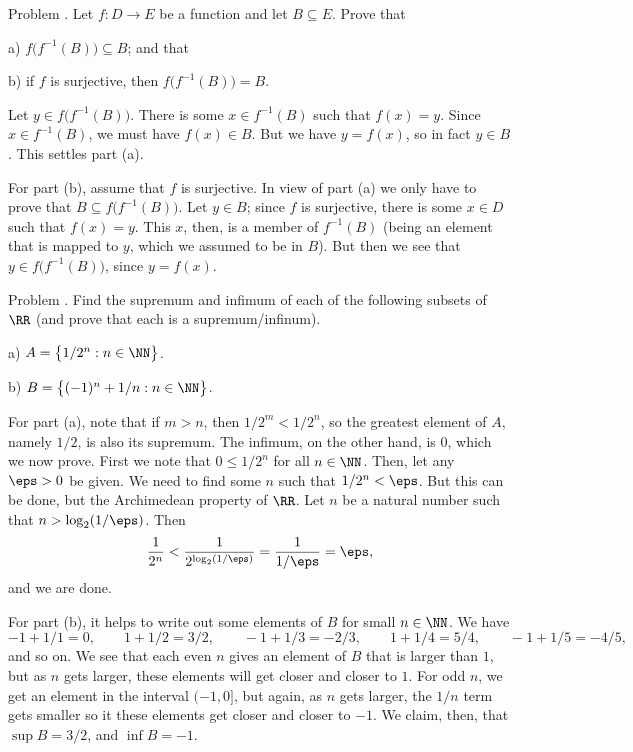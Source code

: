 


\def\To{\Rightarrow}


\bigskip

\proclaim Problem \advthm. Let $f:D\to E$ be a function and let $B\subseteq E$. Prove that
\medskip
\item{a)} $f\bigl( f^{-1}(B)\bigr) \subseteq B$; and that
\smallskip
\item{b)} if $f$ is surjective, then $f\bigl( f^{-1}(B)\bigr) = B$.
\medskip

\proof Let $y\in f\bigl( f^{-1}(B)\bigr)$. There is some $x\in f^{-1}(B)$ such that $f(x) = y$.
Since $x\in f^{-1}(B)$, we must have $f(x)\in B$. But we have $y = f(x)$, so in fact
$y\in B$. This settles part (a).

For part (b), assume that $f$ is surjective.
In view of part (a) we only have to prove that $B\subseteq f\bigl( f^{-1}(B)\bigr)$. Let $y\in B$;
since $f$ is surjective, there is some $x\in D$ such that $f(x) = y$. This $x$, then, is a member
of $f^{-1}(B)$ (being an element that is mapped to $y$, which we assumed to be in $B$). But then
we see that $y\in f\bigl(f^{-1}(B)\bigr)$, since $y = f(x)$.\slug

\proclaim Problem \advthm. Find the supremum and infimum of each of the following subsets of $\RR$ (and
prove that each is a supremum/infinum).
\medskip
\item{a)} $A = \bigl\{ 1/2^n : n\in \NN\bigr\}$.
\smallskip
\item{b)} $B = \bigl\{ (-1)^n + 1/n : n\in \NN \bigr\}$.
\medskip

\proof For part (a), note that if $m > n$, then $1/2^m < 1/2^n$, so the greatest element of $A$,
namely $1/2$, is also its supremum. The infimum, on the other hand, is $0$, which we now prove.
First we note that $0\le 1/2^n$ for all $n\in \NN$. Then, let any $\eps > 0$ be given. We need
to find some $n$ such that $1/2^n < \eps$. But this can be done, but the Archimedean property of
$\RR$. Let $n$ be a natural number such that $n > \log_2(1/\eps)$. Then
$${1\over 2^n} < {1\over 2^{\log_2(1/\eps)}} = {1\over 1/\eps} = \eps,$$
and we are done.

For part (b), it helps to write out some elements of $B$ for small $n\in \NN$. We have
$$-1 + 1/1 = 0,\qquad 1 + 1/2 = 3/2,\qquad -1 + 1/3 = -2/3, \qquad 1 + 1/4 = 5/4,\qquad
-1 + 1/5 = -4/5,$$
and so on. We see that each even $n$ gives an element of $B$ that is larger than $1$, but
as $n$ gets larger, these elements will get closer and closer to $1$. For odd $n$,
we get an element in the interval $(-1, 0]$, but again, as $n$ gets larger, the $1/n$ term
gets smaller so it these elements get closer and closer to $-1$. We claim, then, that $\sup B=3/2$,
and $\inf B = -1$.

